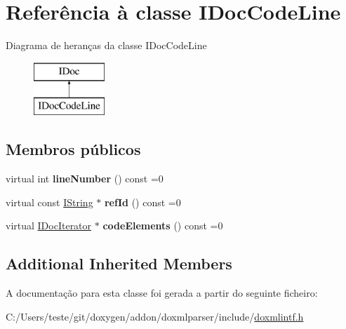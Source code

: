 \hypertarget{class_i_doc_code_line}{\section{Referência à classe I\-Doc\-Code\-Line}
\label{class_i_doc_code_line}
}
Diagrama de heranças da classe I\-Doc\-Code\-Line\begin{figure}[H]
\begin{center}
\leavevmode
\includegraphics[height=2.000000cm]{class_i_doc_code_line}
\end{center}
\end{figure}
\subsection*{Membros públicos}
\begin{DoxyCompactItemize}
\item 
\hypertarget{class_i_doc_code_line_afcc78a2cbad51348ce6a23a0ef5ac1bd}{virtual int {\bfseries line\-Number} () const =0}\label{class_i_doc_code_line_afcc78a2cbad51348ce6a23a0ef5ac1bd}

\item 
\hypertarget{class_i_doc_code_line_a60f519e58362b0fc9165a31c906379e6}{virtual const \hyperlink{class_i_string}{I\-String} $\ast$ {\bfseries ref\-Id} () const =0}\label{class_i_doc_code_line_a60f519e58362b0fc9165a31c906379e6}

\item 
\hypertarget{class_i_doc_code_line_a94e4f28936edc9131e98d0d12dd89ae1}{virtual \hyperlink{class_i_doc_iterator}{I\-Doc\-Iterator} $\ast$ {\bfseries code\-Elements} () const =0}\label{class_i_doc_code_line_a94e4f28936edc9131e98d0d12dd89ae1}

\end{DoxyCompactItemize}
\subsection*{Additional Inherited Members}


A documentação para esta classe foi gerada a partir do seguinte ficheiro\-:\begin{DoxyCompactItemize}
\item 
C\-:/\-Users/teste/git/doxygen/addon/doxmlparser/include/\hyperlink{include_2doxmlintf_8h}{doxmlintf.\-h}\end{DoxyCompactItemize}

